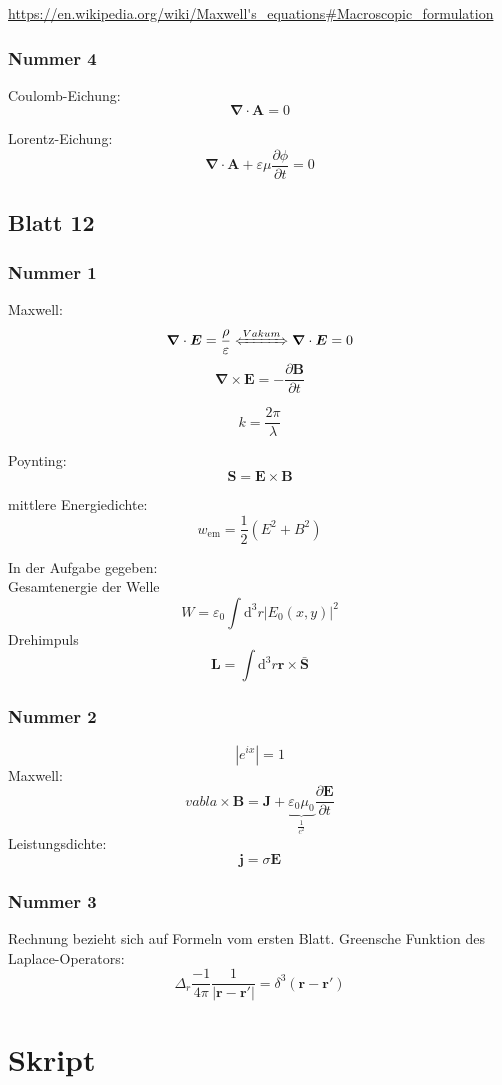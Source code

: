 \documentclass[titlepage,11pt,a4paper,ngerman]{report}
\newcommand{\dd}{\mathrm{d}}
\renewcommand{\vec}[1]{\bm{#1}}
\renewcommand{\epsilon}{\varepsilon}
\newcommand{\vabla}{\vec{\nabla}}
\newcommand{\vepsilon}{\varepsilon}
\begin{document}
\url{https://en.wikipedia.org/wiki/Maxwell's_equations#Macroscopic_formulation}

\subsection{Nummer 4}

Coulomb-Eichung:
\[\vec{\nabla}\cdot\vec{A}=0\]

Lorentz-Eichung:
\[\vec{\nabla}\cdot\vec{A}+\vepsilon\mu\frac{\partial\phi}{\partial t}=0\]

\section{Blatt 12}

\subsection{Nummer 1}
Maxwell:
\[\vabla\cdot\vec{E}=\frac{\rho}{\epsilon}\xLeftrightarrow{Vakum}\vabla\cdot\vec{E}=0\]
\[\vabla\times\vec{E}=-\frac{\partial\vec{B}}{\partial t}\]

\[k=\frac{2\pi}{\lambda}\]

Poynting:
\[\vec{S}=\vec{E}\times\vec{B}\]

mittlere Energiedichte:
\[w_\mathrm{em}=\frac{1}{2}(E^2+B^2)\]

In der Aufgabe gegeben:\\
Gesamtenergie der Welle
\[W=\epsilon_0\int\dd^3r|E_0(x,y)|^2\]
Drehimpuls
\[\vec{L}=\int\dd^3r\vec{r}\times\bar{\vec{S}}\]

\subsection{Nummer 2}

\[|e^{ix}|=1\]
Maxwell:
\[vabla\times\vec{B}=\vec{J}+\underbrace{\epsilon_0\mu_0}_{\frac{1}{c^2}}\frac{\partial\vec{E}}{\partial t}\]
Leistungsdichte:
\[\vec{j}=\sigma\vec{E}\]

\subsection{Nummer 3}

Rechnung bezieht sich auf Formeln vom ersten Blatt.
Greensche Funktion des Laplace-Operators:
\[\Delta_r\frac{-1}{4\pi}\frac{1}{|\vec{r}-\vec{r}'|}=\delta^3(\vec{r}-\vec{r}')\]

\chapter{Skript}
\end{document}
